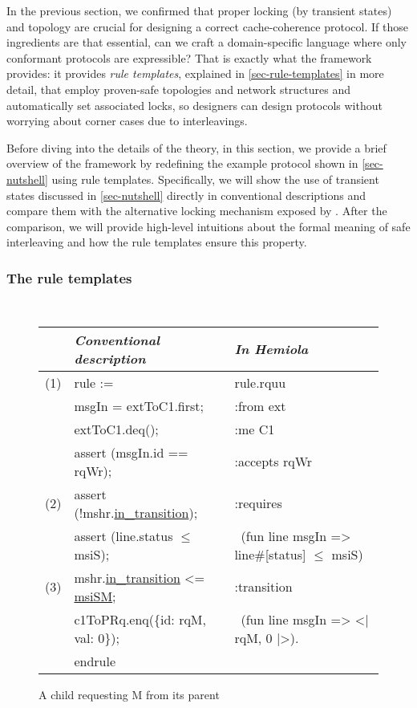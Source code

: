 In the previous section, we confirmed that proper locking (by transient states) and topology are crucial for designing a correct cache-coherence protocol.
If those ingredients are that essential, can we craft a domain-specific language where only conformant protocols are expressible?
That is exactly what the \hemiola{} framework provides: it provides \emph{rule templates}, explained in \autoref{sec-rule-templates} in more detail, that employ proven-safe topologies and network structures and automatically set associated locks, so designers can design protocols without worrying about corner cases due to interleavings.

Before diving into the details of the theory, in this section, we provide a brief overview of the \hemiola{} framework by redefining the example protocol shown in \autoref{sec-nutshell} using rule templates.
Specifically, we will show the use of transient states discussed in \autoref{sec-nutshell} directly in conventional descriptions and compare them with the alternative locking mechanism exposed by \hemiola{}.
After the comparison, we will provide high-level intuitions about the formal meaning of safe interleaving and how the rule templates ensure this property.

\subsubsection{The \hemiola{} rule templates}

\newcommand{\cann}[1]{{\color{mygreen}#1}}
\newcommand{\ccompo}[1]{{\color{myred}#1}}
\newcommand{\ccompt}[1]{{\color{myblue}#1}}
\newcommand{\ccomph}[1]{{\color{mygray}#1}}

\begin{figure}[h]
  \centering\footnotesize\tt\frenchspacing
  \renewcommand{\arraystretch}{1.0}
  \begin{tabular}{|c|l|l|}
    \hline
    & {\sf\it Conventional description} & {\sf\it In Hemiola}\\
    \hline
    (1) & \cann{rule} := & \cann{rule}.rquu\\
    & \ccompo{msgIn} = extToC1.first; & :\cann{from} ext\\
    & extToC1.deq(); & :\cann{me} C1\\
    & \cann{assert} (\ccompo{msgIn}.id == rqWr); & :\cann{accepts} rqWr\\[7pt]
    (2) & \cann{assert} (!\ccomph{mshr}.\underline{in\_transition}); & :\cann{requires}\\
    & \cann{assert} (\ccompt{line}.status $\leq$ msiS); & \ (fun \ccompt{line} \ccompo{msgIn} => \ccompt{line}\#[status] $\leq$ msiS)\\[7pt]
    (3) & \ccomph{mshr}.\underline{in\_transition} <= \underline{msiSM}; & :\cann{transition}\\
    & c1ToPRq.enq(\{id: rqM, val: 0\}); & \ (fun \ccompt{line} \ccompo{msgIn} => <| rqM, 0 |>).\\
    & \cann{endrule} & \\
    \hline
  \end{tabular}
  \caption{A child requesting M from its parent}
  \label{fig-overview-1}
\end{figure}

